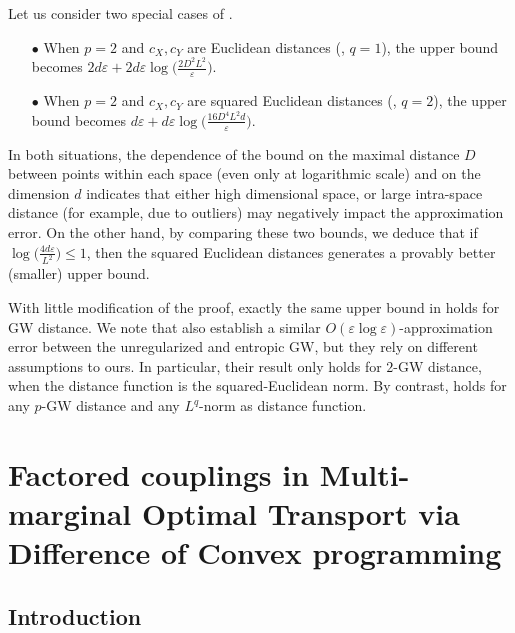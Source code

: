 Let us consider two special cases of .
\begin{itemize}
  \item[$\bullet$] When $p=2$ and $c_X, c_Y$ are Euclidean distances (\ie, $q=1$),
  the upper bound becomes $2d \varepsilon + 2d\varepsilon \log\Big( \frac{2 D^2 L^2}{\varepsilon} \Big)$.

  \item[$\bullet$] When $p=2$ and $c_X, c_Y$ are squared Euclidean distances
  (\ie, $q=2$), the upper bound becomes
  $d\varepsilon + d\varepsilon \log\Big( \frac{16 D^4 L^2 d}{\varepsilon} \Big)$.
\end{itemize}
In both situations, the dependence of the bound on the maximal distance $D$ between points
within each space (even only at logarithmic scale) and on the dimension $d$ indicates
that either high dimensional space, or large intra-space distance (for example, due to outliers)
may negatively impact the approximation error. On the other hand,
by comparing these two bounds, we deduce that if $\log \big( \frac{4d \varepsilon}{L^2} \big) \leq 1$,
then the squared Euclidean distances generates a provably better (smaller) upper bound.

With little modification of the proof, exactly the same upper bound in 
holds for GW distance. We note that \citet{Zhang23} also establish a similar
$O(\varepsilon \log \varepsilon)$-approximation error between the unregularized and entropic GW,
but they rely on different assumptions to ours. In particular, their result only holds
for $2$-GW distance, when the distance function is the squared-Euclidean norm. By contrast,
 holds for any $p$-GW distance and any $L^q$-norm as distance function.

\section{Factored couplings in Multi-marginal Optimal
Transport via Difference of Convex programming} \label{subsec:MMOT_DC}

\subsection{Introduction}

